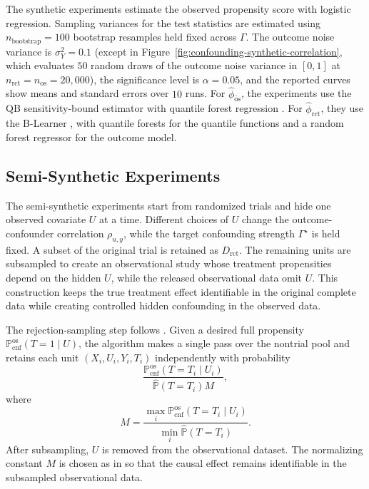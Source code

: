 The synthetic experiments estimate the observed propensity score with logistic regression. Sampling variances for the test statistics are estimated using \(n_{\mathrm{bootstrap}}=100\) bootstrap resamples held fixed across \(\Gamma\). The outcome noise variance is \(\sigma_Y^2=0.1\) (except in Figure~\ref{fig:confounding-synthetic-correlation}, which evaluates \(50\) random draws of the outcome noise variance in \([0,1]\) at \(n_{\mathrm{rct}}=n_{\mathrm{os}}=20{,}000\)), the significance level is \(\alpha=0.05\), and the reported curves show means and standard errors over \(10\) runs. For \(\widehat{\phi}_{\widetilde{\mathrm{os}}}\), the experiments use the QB sensitivity-bound estimator \citep{dorn2022sharp} with quantile forest regression \citep{meinshausen2006quantile}. For \(\widehat{\phi}_{\mathrm{rct}}\), they use the B-Learner \citep{oprescu2023b}, with quantile forests for the quantile functions and a random forest regressor for the outcome model.

\subsection{Semi-Synthetic Experiments}
\label{app:confounding-semisynthetic-details}

The semi-synthetic experiments start from randomized trials and hide one observed covariate \(U\) at a time. Different choices of \(U\) change the outcome-confounder correlation \(\rho_{u,y}\), while the target confounding strength \(\Gamma^\star\) is held fixed. A subset of the original trial is retained as \(D_{\mathrm{rct}}\). The remaining units are subsampled to create an observational study whose treatment propensities depend on the hidden \(U\), while the released observational data omit \(U\). This construction keeps the true treatment effect identifiable in the original complete data while creating controlled hidden confounding in the observed data.

The rejection-sampling step follows \citet{keith2023rct}. Given a desired full propensity \(\mathbb{P}^{\mathrm{os}}_{\mathrm{cnf}}(T=1\mid U)\), the algorithm makes a single pass over the nontrial pool and retains each unit \((X_i,U_i,Y_i,T_i)\) independently with probability
\[
  \frac{
    \mathbb{P}^{\mathrm{os}}_{\mathrm{cnf}}(T=T_i\mid U_i)
  }{
    \widehat{\mathbb{P}}(T=T_i)M
  },
\]
where
\[
  M
  =
  \frac{
    \max_i \mathbb{P}^{\mathrm{os}}_{\mathrm{cnf}}(T=T_i\mid U_i)
  }{
    \min_i \widehat{\mathbb{P}}(T=T_i)
  }.
\]
After subsampling, \(U\) is removed from the observational dataset. The normalizing constant \(M\) is chosen as in \citet{keith2023rct} so that the causal effect remains identifiable in the subsampled observational data.


